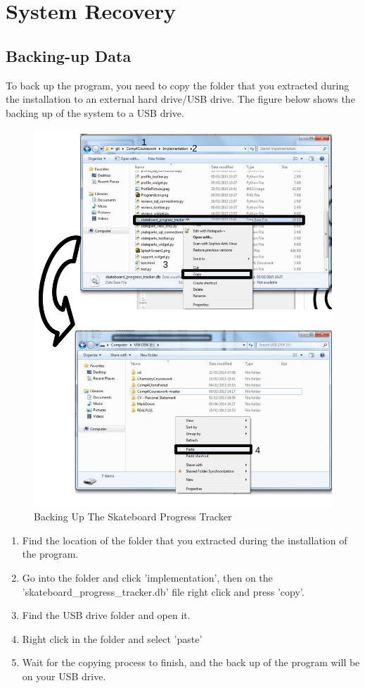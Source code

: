 \section{System Recovery}

\subsection{Backing-up Data} 

To back up the program, you need to copy the folder that you extracted during the installation to an external hard drive/USB drive. The figure below shows the backing up of the system to a USB drive.

\begin{figure}[H]
    \includegraphics[width=\textwidth]{./Manual/Images/BackUp.pdf}
    \caption{Backing Up The Skateboard Progress Tracker} \label{fig:BackUp}
\end{figure}

\begin{enumerate}
\item Find the location of the folder that you extracted during the installation of the program.
\item Go into the folder and click 'implementation', then on the 'skateboard\_progress\_tracker.db' file right click and press 'copy'.
\item Find the USB drive folder and open it.
\item Right click in the folder and select 'paste' 
\item Wait for the copying process to finish, and the back up of the program will be on your USB drive.
\end{enumerate}

